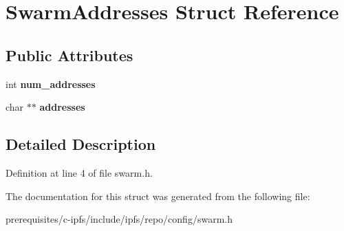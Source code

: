 \hypertarget{struct_swarm_addresses}{}\section{Swarm\+Addresses Struct Reference}
\label{struct_swarm_addresses}
\subsection*{Public Attributes}
\begin{DoxyCompactItemize}
\item 
\mbox{\label{struct_swarm_addresses_a9596c0ba92e1909f6429230c2efb0cbb}} 
int {\bfseries num\+\_\+addresses}
\item 
\mbox{\label{struct_swarm_addresses_a4c1a52dc29ed8733bff72eb63f5d2426}} 
char $\ast$$\ast$ {\bfseries addresses}
\end{DoxyCompactItemize}


\subsection{Detailed Description}


Definition at line 4 of file swarm.\+h.



The documentation for this struct was generated from the following file\+:\begin{DoxyCompactItemize}
\item 
prerequisites/c-\/ipfs/include/ipfs/repo/config/swarm.\+h\end{DoxyCompactItemize}
